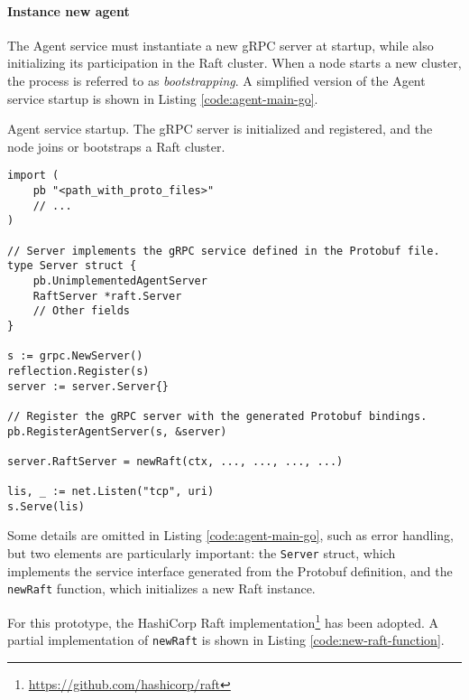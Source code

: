 \paragraph{Instance new agent}

The Agent service must instantiate a new gRPC server at startup, while also initializing its participation in the Raft cluster. When a node starts a new cluster, the process is referred to as \emph{bootstrapping}. A simplified version of the Agent service startup is shown in Listing \ref{code:agent-main-go}.

\begin{listing}[H]
\caption{Agent service startup. The gRPC server is initialized and registered, and the node joins or bootstraps a Raft cluster.}
\label{code:agent-main-go}
\begin{verbatim}
import (
    pb "<path_with_proto_files>"
    // ...
)

// Server implements the gRPC service defined in the Protobuf file.
type Server struct {
    pb.UnimplementedAgentServer
    RaftServer *raft.Server
    // Other fields
}

s := grpc.NewServer()
reflection.Register(s)
server := server.Server{}

// Register the gRPC server with the generated Protobuf bindings.
pb.RegisterAgentServer(s, &server)

server.RaftServer = newRaft(ctx, ..., ..., ..., ...)

lis, _ := net.Listen("tcp", uri)
s.Serve(lis)
\end{verbatim}
\end{listing}

Some details are omitted in Listing \ref{code:agent-main-go}, such as error handling, but two elements are particularly important:
the \texttt{Server} struct, which implements the service interface generated from the Protobuf definition, and the \texttt{newRaft} function, which initializes a new Raft instance.  

For this prototype, the HashiCorp Raft implementation\footnote{\url{https://github.com/hashicorp/raft}} has been adopted. A partial implementation of \texttt{newRaft} is shown in Listing \ref{code:new-raft-function}.

